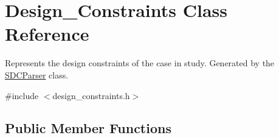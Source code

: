 \hypertarget{classDesign__Constraints}{\section{Design\-\_\-\-Constraints Class Reference}
\label{classDesign__Constraints}
}


Represents the design constraints of the case in study. Generated by the \hyperlink{classSDCParser}{S\-D\-C\-Parser} class.  




{\ttfamily \#include $<$design\-\_\-constraints.\-h$>$}

\subsection*{Public Member Functions}
